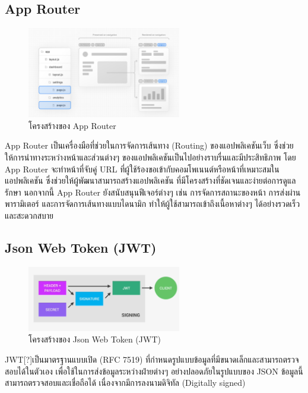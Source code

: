   \subsection{App Router}
    \begin{figure}[!h]
      \centering
      \includegraphics[width=0.6\textwidth]{image/Background/app-router.png}
      \caption[App Router]{โครงสร้างของ App Router}
      \label{fig:app_router_pic}
    \end{figure}
    \FloatBarrier
    \qquad App Router เป็นเครื่องมือที่ช่วยในการจัดการเส้นทาง (Routing) ของแอปพลิเคชันเว็บ
    ซึ่งช่วยให้การนำทางระหว่างหน้าและส่วนต่างๆ ของแอปพลิเคชันเป็นไปอย่างราบรื่นและมีประสิทธิภาพ โดย App Router
    จะทำหน้าที่จับคู่ URL ที่ผู้ใช้ร้องขอเข้ากับคอมโพเนนต์หรือหน้าที่เหมาะสมในแอปพลิเคชัน ซึ่งช่วยให้ผู้พัฒนาสามารถสร้างแอปพลิเคชัน
    ที่มีโครงสร้างที่ชัดเจนและง่ายต่อการดูแลรักษา นอกจากนี้ App Router ยังสนับสนุนฟีเจอร์ต่างๆ เช่น การจัดการสถานะของหน้า
    การส่งผ่านพารามิเตอร์ และการจัดการเส้นทางแบบไดนามิก ทำให้ผู้ใช้สามารถเข้าถึงเนื้อหาต่างๆ ได้อย่างรวดเร็วและสะดวกสบาย
    \cite{AppRouter} \cite{Routing}

  \subsection{Json Web Token (JWT)}
    \begin{figure}[!h]
      \centering
      \includegraphics[width=0.6\textwidth]{image/Background/JWT.png}
      \caption[JWT]{โครงสร้างของ Json Web Token (JWT)}
      \label{fig:jwt_pic}
    \end{figure}
    \FloatBarrier
    \qquad JWT[?]เป็นมาตรฐานแบบเปิด (RFC 7519) ที่กําหนดรูปแบบข้อมูลที่มีขนาดเล็กและสามารถตรวจสอบได้ในตัวเอง
    เพื่อใช้ในการส่งข้อมูลระหว่างฝ่ายต่างๆ อย่างปลอดภัยในรูปแบบของ JSON ข้อมูลนี้สามารถตรวจสอบและเชื่อถือได้
    เนื่องจากมีการลงนามดิจิทัล (Digitally signed) \cite{JWT}
  
